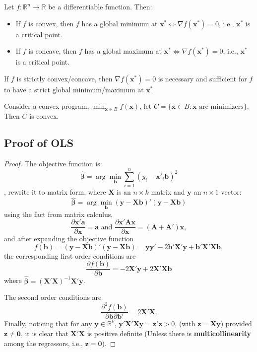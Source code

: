 \begin{proposition}
    Let $f: \mathbb{R}^{n} \to \mathbb{R}$ be a differentiable function. Then: \begin{itemize}
        \item If $f$ is convex, then $f$ has a global minimum at $\mathbf{x ^{*}} \iff \nabla f(\mathbf{x ^{*}}) = 0$, i.e., $\mathbf{x ^{*}}$ is a critical point.
        \item If $f$ is concave, then $f$ has a global maximum at $\mathbf{x ^{*}} \iff \nabla f(\mathbf{x ^{*}}) = 0$, i.e., $\mathbf{x ^{*}}$ is a critical point.
    \end{itemize}
\end{proposition}

\begin{remark*}
    If $f$ is strictly convex/concave, then $\nabla f(\mathbf{x ^{*}}) = 0$ is necessary and sufficient for $f$ to have a strict global minimum/maximum at $\mathbf{x ^{*}}$.
\end{remark*}

\begin{proposition}
    Consider a convex program, $\min_{\mathbf{x} \in B} f(\mathbf{x})$, let $C = \{\mathbf{x} \in B: \mathbf{x} \text{ are minimizers}\}$. Then $C$ is convex.
\end{proposition}

\subsection{Proof of OLS}

\begin{proof}
    The objective function is:
    \[
        \hat{\boldsymbol{\beta}} = \arg \min_{\mathbf{b}} \sum_{i=1}^{n} (y_i - \mathbf{x}'_i \mathbf{b})^{2}
    \]
    , rewrite it to matrix form, where $\mathbf{X}$ is an $n \times k$ matrix and $\mathbf{y}$ an $n \times 1$ vector:
    \[
        \hat{\boldsymbol{\beta}} = \arg \min_{\mathbf{b}} (\mathbf{y-Xb})'(\mathbf{y-Xb})
    \]
    using the fact from matrix calculus, \[
        \frac{\partial \mathbf{x'a}}{\partial \mathbf{x}} = \mathbf{a} \text{ and } \frac{\partial \mathbf{x'Ax}}{\partial \mathbf{x}} = (\mathbf{A + A'})\mathbf{x},
    \]
    and after expanding the objective function \[
        f(\mathbf{b}) = \mathbf{(y-Xb)'(y-Xb)} = \mathbf{yy'} - 2 \mathbf{b'X'y} + \mathbf{b'X'Xb},
    \]
    the corresponding first order conditions are \[
        \frac{\partial f(\mathbf{b})}{\partial \mathbf{b}} = -2 \mathbf{X'y} + 2 \mathbf{X'Xb}
    \] where $\hat{\boldsymbol{\beta}} = (\mathbf{X'X})^{-1}\mathbf{X'y}$.

    The second order conditions are \[
        \frac{\partial ^{2}f(\mathbf{b})}{\partial \mathbf{b} \partial \mathbf{b'}} = 2 \mathbf{X'X}.
    \]
    Finally, noticing that for any $\mathbf{y} \in \mathbb{R}^{k}$, $\mathbf{y'X'Xy} = \mathbf{z'z} >0 $, (with $\mathbf{z} = \mathbf{Xy}$) provided $\mathbf{z \neq 0}$, it is clear that $\mathbf{X'X}$ is positive definite (Unless there is \textbf{multicollinearity} among the regressors, i.e., $\mathbf{z = 0}$).
\end{proof}


